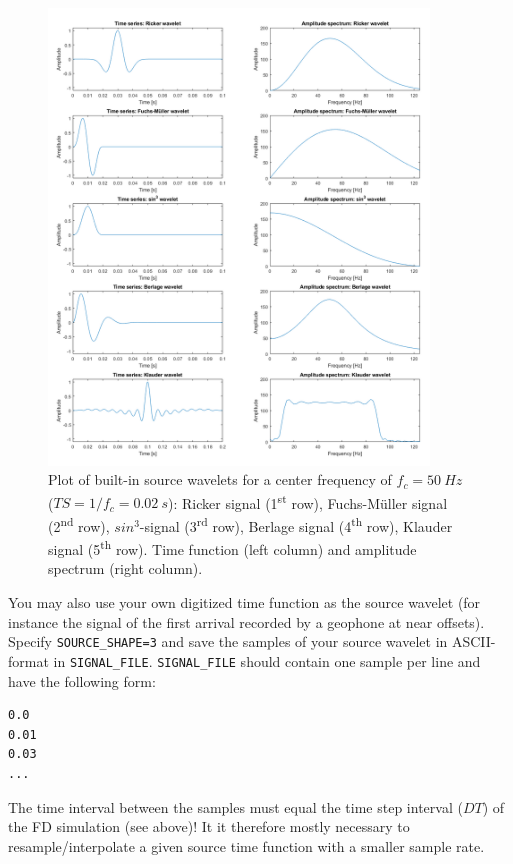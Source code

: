 \begin{figure}
\centering
    \includegraphics[width=0.9\textwidth]{figures/signals.png}
    \caption{Plot of built-in source wavelets for a center frequency of $f_c=\SI{50}{Hz}$ ($TS=1/f_c=\SI{0.02}{s}$): Ricker signal (1\textsuperscript{st} row), Fuchs-M\"uller signal (2\textsuperscript{nd} row), $sin^3$-signal (3\textsuperscript{rd} row), Berlage signal (4\textsuperscript{th} row), Klauder signal (5\textsuperscript{th} row). Time function (left column) and amplitude spectrum (right column).}
\label{fig_source_wavelets}
\end{figure}

You may also use your own digitized time function as the source wavelet (for instance the signal of the first arrival recorded by a geophone at near offsets). Specify \texttt{SOURCE\_SHAPE=3} and save the samples of your source wavelet in ASCII-format in \texttt{SIGNAL\_FILE}. \texttt{SIGNAL\_FILE} should contain one sample per line and have the following form:
\begin{verbatim}
0.0
0.01
0.03
...
\end{verbatim}

The time interval between the samples must equal the time step interval ($DT$) of the FD simulation (see above)! It it therefore mostly necessary to resample/interpolate a given source time function with a smaller sample rate.\\

